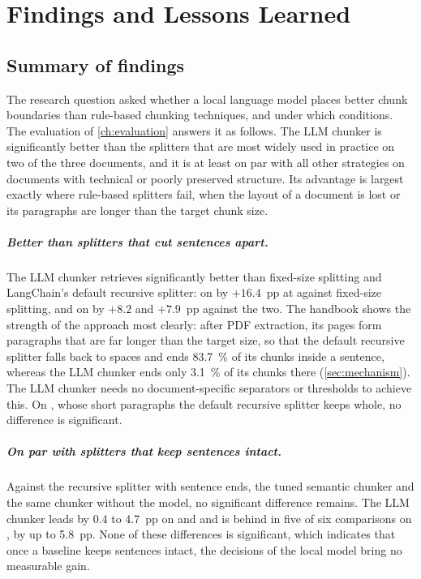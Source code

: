 \chapter{Findings and Lessons Learned}
\label{ch:lessons}

\section{Summary of findings}
\label{sec:findings}

The research question asked whether a local language model places better chunk boundaries
than rule-based chunking techniques, and under which conditions. The evaluation of
\cref{ch:evaluation} answers it as follows. The LLM chunker is significantly better than the
splitters that are most widely used in practice on two of the three documents, and it is at least on par with all other
strategies on documents with technical or poorly preserved structure. Its advantage is
largest exactly where rule-based splitters fail, when the layout of a document is
lost or its paragraphs are longer than the target chunk size.

\paragraph{Better than splitters that cut sentences apart.} The LLM chunker retrieves
significantly better than fixed-size splitting and LangChain's default recursive splitter:
on  by $+16.4$~pp at  against fixed-size splitting, and on
 by $+8.2$ and $+7.9$~pp against the two. The  handbook shows the
strength of the approach most clearly: after PDF extraction, its pages form paragraphs that are far longer than the target size, so that the default
recursive splitter falls back to spaces and ends \SI{83.7}{\percent} of its chunks inside
a sentence, whereas the LLM chunker ends only \SI{3.1}{\percent} of its chunks there (\cref{sec:mechanism}). The LLM chunker needs no document-specific separators or
thresholds to achieve this. On , whose short paragraphs the default recursive
splitter keeps whole, no difference is significant.

\paragraph{On par with splitters that keep sentences intact.} Against the recursive
splitter with sentence ends, the tuned semantic chunker and the same chunker without the
model, no significant difference remains. The LLM chunker leads by 0.4 to 4.7~pp on
 and  and is behind in five of six comparisons on ,
by up to 5.8~pp. None of these differences is significant, which indicates that once a
baseline keeps sentences intact, the decisions of the local model bring no measurable
gain.

